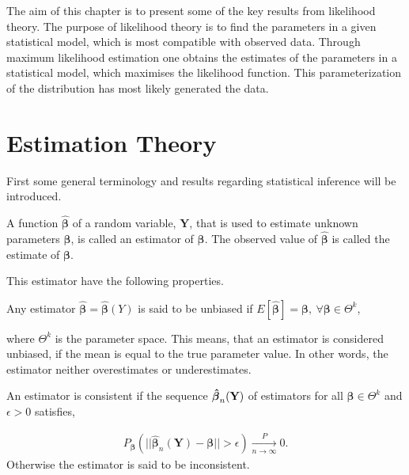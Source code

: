 The aim of this chapter is to present some of the key results from likelihood theory. 
The purpose of likelihood theory is to find the parameters in a given statistical model, which is most compatible with observed data. 
Through maximum likelihood estimation one obtains the estimates of the parameters in a statistical model, which maximises the likelihood function. 
This parameterization of the distribution has most likely generated the data.

\section{Estimation Theory}

First some general terminology and results regarding statistical inference will be introduced.

\begin{definition} 
    A function $\boldsymbol{\hat{\beta}}$ of a random variable, $\textbf{Y}$, that is used to estimate unknown parameters $\boldsymbol{\beta}$, is called an estimator of $\boldsymbol{\beta}$. The observed value of $\boldsymbol{\hat{\beta}}$ is called the estimate of $\boldsymbol{\beta}$.
\end{definition}

This estimator have the following properties. 

\begin{definition}
\label{def:Unbiased_estmator}
Any estimator $\boldsymbol{\hat{\beta}} = \boldsymbol{\hat{\beta}}(Y)$ is said to be unbiased if $E[\boldsymbol{\hat{\beta}}] = \boldsymbol{\beta}, \ \forall \boldsymbol{\beta} \in \Theta^k$,
\end{definition}

where $\Theta^k$ is the parameter space. This means, that an estimator is considered unbiased, if the mean is equal to the true parameter value. 
In other words, the estimator neither overestimates or underestimates.

\begin{definition} 
\label{def:consistent_estimator}
An estimator is consistent if the sequence $\operatorname{\boldsymbol{\hat{\beta}}}_n(\textbf{Y})$ of estimators for all $\boldsymbol{\beta} \in \Theta^k$ and $\epsilon > 0$ satisfies,

\begin{align*}
    P_{\boldsymbol{\beta}}(||\hat{\boldsymbol{\beta}}_n(\textbf{Y}) - \boldsymbol{\beta}|| > \epsilon) \xrightarrow[n \rightarrow \infty]{P} 0.
\end{align*}
Otherwise the estimator is said to be inconsistent.
\end{definition}

